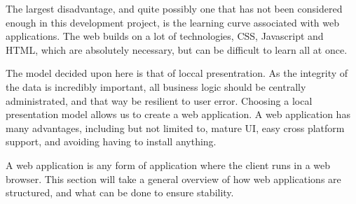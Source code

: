 The largest disadvantage, and quite possibly one that has not been considered enough in this development project, is the learning curve associated with web applications.
The web builds on a lot of technologies, CSS, Javascript and HTML, which are absolutely necessary, but can be difficult to learn all at once.

The model decided upon here is that of loccal presentration.
As the integrity of the data is incredibly important, all business logic should be centrally administrated, and that way be resilient to user error.
Choosing a local presentation model allows us to create a web application.
A web application has many advantages, including but not limited to, mature UI, easy cross platform support, and avoiding having to install anything.

A web application is any form of application where the client runs in a web browser.
This section will take a general overview of how web applications are structured, and what can be done to ensure stability.
